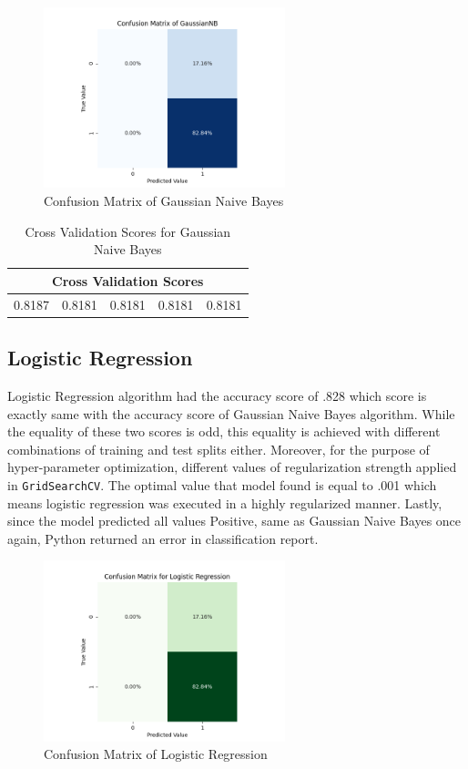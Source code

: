 \documentclass[a4paper]{article}
\begin{document}
\begin{figure}[htbp!]
    \centering
    \includegraphics[width=7cm]{Visualizations/gnb_conf.png}
    \caption{Confusion Matrix of Gaussian Naive Bayes}
\end{figure}

\begin{table}[htbp!]
\centering
\begin{tabular}{ |c|c|c|c|c| } 
 \hline
 \multicolumn{5}{|c|}{\textbf{Cross Validation Scores}} \\
 \hline
 0.8187 & \cellcolor[HTML]{B8D8FF}0.8181 & \cellcolor[HTML]{B8D8FF}0.8181 & \cellcolor[HTML]{B8D8FF}0.8181 & \cellcolor[HTML]{B8D8FF}0.8181 \\ 
 \hline
\end{tabular}
\caption{Cross Validation Scores for Gaussian Naive Bayes}
\end{table}

\subsection*{Logistic Regression}

     Logistic Regression algorithm had the accuracy score of .828 which score is exactly same with the accuracy score of Gaussian Naive Bayes algorithm. While the equality of these two scores is odd, this equality is achieved with different combinations of training and test splits either. Moreover, for the purpose of hyper-parameter optimization, different values of regularization strength applied in \verb|GridSearchCV|. The optimal value that model found is equal to .001 which means logistic regression was executed in a highly regularized manner. Lastly, since the model predicted all values Positive, same as Gaussian Naive Bayes once again, Python returned an error in classification report.
    
\begin{figure}[htbp!]
    \centering
    \includegraphics[width=7cm]{Visualizations/logreg_conf.png}
    \caption{Confusion Matrix of Logistic Regression}
\end{figure}
\end{document}

